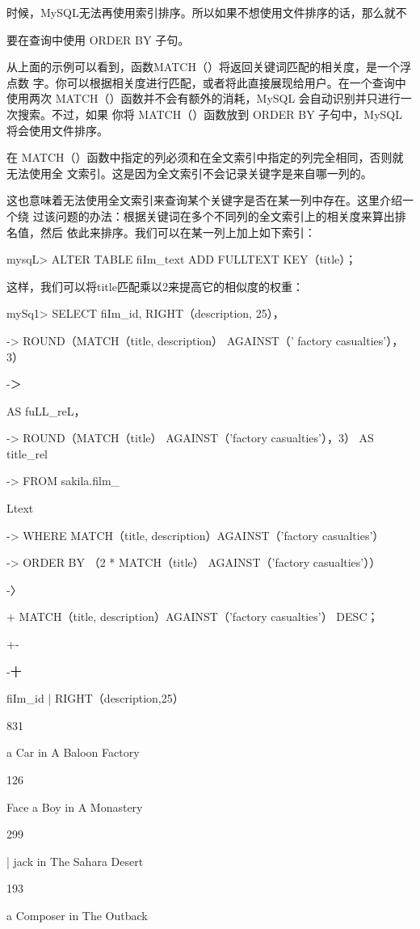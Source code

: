 时候，MySQL无法再使用索引排序。所以如果不想使用文件排序的话，那么就不

要在查询中使用 ORDER BY 子句。

从上面的示例可以看到，函数MATCH（）将返回关键词匹配的相关度，是一个浮点数
字。你可以根据相关度进行匹配，或者将此直接展现给用户。在一个查询中使用两次
MATCH（）函数并不会有额外的消耗，MySQL 会自动识别并只进行一次搜索。不过，如果
你将 MATCH（）函数放到 ORDER BY 子句中，MySQL 将会使用文件排序。

在 MATCH（）函数中指定的列必须和在全文索引中指定的列完全相同，否则就无法使用全
文索引。这是因为全文索引不会记录关键字是来自哪一列的。

这也意味着无法使用全文索引来查询某个关键字是否在某一列中存在。这里介绍一个绕
过该问题的办法：根据关键词在多个不同列的全文索引上的相关度来算出排名值，然后
依此来排序。我们可以在某一列上加上如下索引：

mysqL> ALTER TABLE fiIm\_text ADD FULLTEXT KEY（title）；

这样，我们可以将title匹配乘以2来提高它的相似度的权重：

mySq1> SELECT fiIm\_id, RIGHT（description, 25），

-> ROUND（MATCH（title, description） AGAINST（' factory casualties'）， 3）

-＞

AS fuLL\_reL，

-> ROUND（MATCH（title） AGAINST（'factory casualties'），3） AS title\_rel

-> FROM sakila.film\_

Ltext

-> WHERE MATCH（title, description）AGAINST（'factory casualties'）

-> ORDER BY （2 * MATCH（title） AGAINST（'factory casualties'））

-〉

+ MATCH（title, description）AGAINST（'factory casualties'） DESC；

+-

-十

fiIm\_id | RIGHT（description,25）

831

a Car in A Baloon Factory

126

Face a Boy in A Monastery

299

| jack in The Sahara Desert

193

a Composer in The Outback

